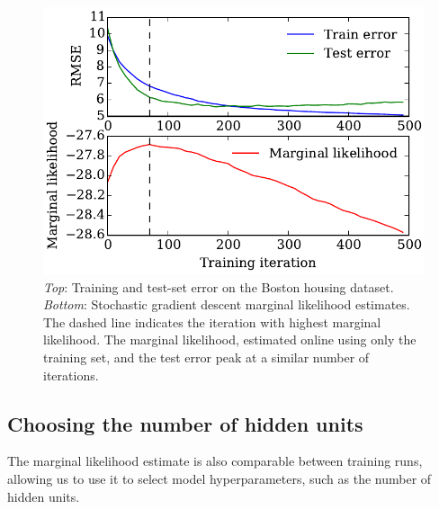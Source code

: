 \documentclass[]{article}
\begin{document}
\begin{figure}[h!]
\begin{center}
\includegraphics[width=\columnwidth]{../experiments/2015_03_01_housing/2/marglik.pdf}
\vskip -0.1in
\caption{\emph{Top}: Training and test-set error on the Boston housing dataset.
\emph{Bottom}: Stochastic gradient descent marginal likelihood estimates.
The dashed line indicates the iteration with highest marginal likelihood.
The marginal likelihood, estimated online using only the training set, and the
test error peak at a similar number of iterations.}
\label{fig:housing}
\end{center}
\end{figure}



\subsection{Choosing the number of hidden units}


The marginal likelihood estimate is also comparable between training runs, allowing us to use it to select model hyperparameters, such as the number of hidden units.
\end{document}

